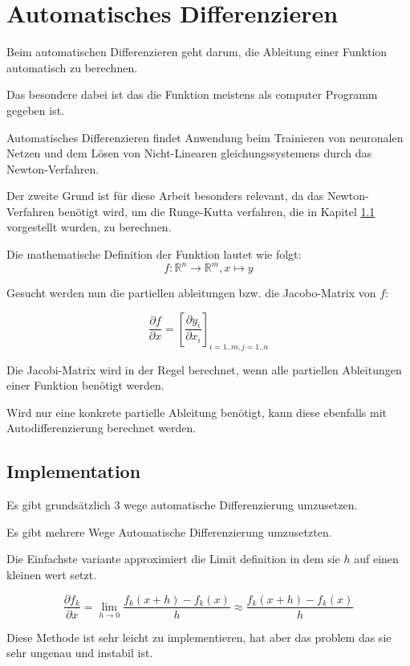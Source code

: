 
\section{Automatisches Differenzieren}

Beim automatischen Differenzieren geht darum, die Ableitung einer Funktion automatisch zu berechnen.

Das besondere dabei ist das die Funktion meistens als computer Programm gegeben ist.

Automatisches Differenzieren findet Anwendung beim Trainieren von neuronalen Netzen und dem Lösen von Nicht-Linearen gleichungssystemens durch das Newton-Verfahren.

Der zweite Grund ist für diese Arbeit besonders relevant, da 
das Newton-Verfahren benötigt wird, um die Runge-Kutta verfahren, die in Kapitel \ref{} vorgestellt wurden, zu berechnen.

Die mathematische Definition der Funktion lautet wie folgt:
$$
f: \mathbb{R}^n \rightarrow \mathbb{R}^m, x \mapsto y
$$

Gesucht werden nun die partiellen ableitungen bzw. die Jacobo-Matrix von $f$:

$$
\frac{\partial f}{\partial x} = \left[ \frac{\partial y_i}{\partial x_i} \right]_{i=1..m, j=1..n} 
$$


Die Jacobi-Matrix wird in der Regel berechnet, wenn alle partiellen Ableitungen einer Funktion benötigt werden.

Wird nur eine konkrete partielle Ableitung benötigt, kann diese ebenfalls mit Autodifferenzierung berechnet werden.

\subsection{Implementation}

Es gibt grundsätzlich 3 wege automatische Differenzierung umzusetzen.

Es gibt mehrere Wege Automatische Differenzierung umzusetzten.

Die Einfachste variante approximiert die Limit definition in dem sie $h$ auf einen kleinen wert setzt.

$$
\frac{\partial f_k}{\partial x} = \lim_{h \to 0} \frac{f_k(x+ h) - f_k(x)}{h} \approx \frac{f_k(x + h) - f_k(x)}{h} 
$$


Diese Methode ist sehr leicht zu implementieren, hat aber das problem das sie sehr ungenau und instabil ist.

